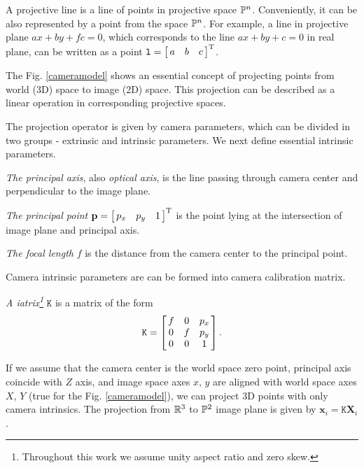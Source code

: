 \begin{defn}
A projective line is a line of points in projective space $\Proj^{n}$. Conveniently, it can be also represented by a point from the space  $\Proj^{n}$. For example, a line in projective plane $a x + b y + f c = 0$, which corresponds to the line $a x + b y + c = 0$ in  real plane, can be written as a point $\mathtt{l} = \mat{ccc}{a & b & c}^\T$.
\end{defn}


The Fig. \ref{cameramodel} shows an essential concept of projecting points from world (3D) space to image (2D) space. This projection can be described as a linear operation in corresponding projective spaces. 

The projection operator is given by camera parameters, which can be divided in two groups - extrinsic and intrinsic parameters.
We next define essential intrinsic parameters. 

\begin{defn}
\textit{The principal axis}, also \textit{optical axis}, is the line passing through camera center and perpendicular to the image plane.
\end{defn}

\begin{defn}
\textit{The principal point} $\mathbf{p}=\mat{ccc}{p_x & p_y & 1}^\T$ is the point lying at the intersection  of image plane and principal axis.
\end{defn}

\begin{defn}
\textit{The focal length} $f$ is the distance from the camera center to the principal point. 
\end{defn}

Camera intrinsic parameters are can be formed into camera calibration matrix.

\begin{defn}
\textit{A iatrix\footnote{Throughout this work we assume unity aspect ratio and zero skew.}} $\mathtt{K}$ is a matrix of the form \[ \mathtt{K} = \mat{ccc}{f & 0 & p_x \\ 0 & f & p_y \\ 0 & 0 & 1}. \] 
\end{defn}

If we assume that the camera center is the world space zero point, principal axis coincide with $Z$ axis, and image space axes $x$, $y$ are aligned with world space axes $X$, $Y$ (true for the Fig. \ref{cameramodel}), we can project 3D points with only camera intrinsics. The projection from $\R^3$ to $\Proj^2$ image plane is given by $\mathbf{x}_i = \mathtt{K} \mathbf{X}_i $.

